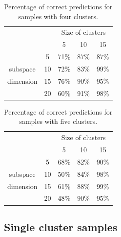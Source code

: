 \documentclass[12pt]{article}
\begin{document}
\begin{table}[H]
\begin{center}
	\begin{tabular}{cc|c|c|c|}
		\cline{3-5}
		& & \multicolumn{3}{c|}{Size of clusters} \\ 
		\cline{3-5}
		& & 5 & 10 & 15 \\
		\hline
		\multicolumn{1}{|c}{} & 
		\multicolumn{1}{|c|}{5} & 71\% & 87\%& 87\%	 	\\ \cline{2-5}
		\multicolumn{1}{|c}{ subspace} & 
		\multicolumn{1}{|c|}{10} & 72\% & 83\%& 99\% 	\\ \cline{2-5}
		\multicolumn{1}{|c}{ dimension} & 
		\multicolumn{1}{|c|}{15} & 76\% & 90\%& 95\% 	\\ \cline{2-5}
		\multicolumn{1}{|c}{} & 
		\multicolumn{1}{|c|}{20} & 60\% & 91\%& 98\% 	\\ \cline{1-5}
	\end{tabular}
	\caption{Percentage of correct predictions for samples with four clusters.}
\end{center}
\end{table}

\begin{table}[H]
\begin{center}
	\begin{tabular}{cc|c|c|c|}
		\cline{3-5}
		& & \multicolumn{3}{c|}{Size of clusters} \\ 
		\cline{3-5}
		& & 5 & 10 & 15 \\
		\hline
		\multicolumn{1}{|c}{} & 
		\multicolumn{1}{|c|}{5} & 68\% & 82\%& 90\%	 	\\ \cline{2-5}
		\multicolumn{1}{|c}{ subspace} & 
		\multicolumn{1}{|c|}{10} & 50\% & 84\%& 98\% 	\\ \cline{2-5}
		\multicolumn{1}{|c}{ dimension} & 
		\multicolumn{1}{|c|}{15} & 61\% & 88\%& 99\% 	\\ \cline{2-5}
		\multicolumn{1}{|c}{} & 
		\multicolumn{1}{|c|}{20} & 48\% & 90\%& 95\% 	\\ \cline{1-5}
	\end{tabular}
	\caption{Percentage of correct predictions for samples with five clusters.}
\end{center}
\end{table}

\subsection{Single cluster samples}
\end{document}
